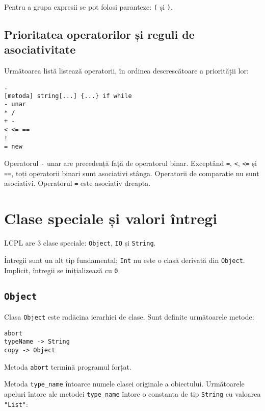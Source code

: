 \documentclass[12pt]{article}
\begin{document}

Pentru a grupa expresii se pot folosi paranteze: \texttt{(} și \texttt{)}.

\subsection{Prioritatea operatorilor și reguli de asociativitate}

Următoarea listă listează operatorii, în ordinea descrescătoare a priorității lor:

\begin{verbatim}
.
[metoda] string[...] {...} if while
- unar
* /
+ -
< <= ==
!
= new
\end{verbatim}

Operatorul \texttt{-} unar are precedență față de operatorul binar. Exceptând \texttt{=}, \texttt{<}, \texttt{<=} și \texttt{==}, toți operatorii binari sunt asociativi stânga. Operatorii de comparație nu sunt asociativi. Operatorul \texttt{=} este asociativ dreapta.



\section{Clase speciale și valori întregi}
LCPL are 3 clase speciale: \texttt{Object}, \texttt{IO} și \texttt{String}.

Întregii sunt un alt tip fundamental; \texttt{Int} nu este o clasă derivată din \texttt{Object}. Implicit, întregii se inițializează cu \texttt{0}.

\subsection{\texttt{Object}}

Clasa \texttt{Object} este radăcina ierarhiei de clase. Sunt definite următoarele metode:

\begin{verbatim}
abort 
typeName -> String
copy -> Object
\end{verbatim}

Metoda \texttt{abort} termină programul forțat.

Metoda \texttt{type\_name} întoarce numele clasei originale a obiectului. Următoarele apeluri întorc ale metodei \texttt{type\_name} întorc o constanta de tip \texttt{String} cu valoarea \texttt{"List"}:
\end{document}

